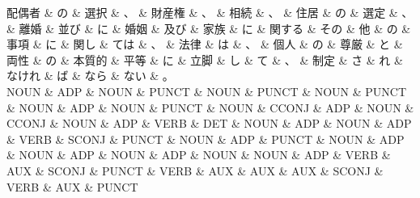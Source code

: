 \documentclass[tikz,border=5pt]{standalone}
\begin{document}
\small
\begin{dependency}[edge unit distance=11.9pt]
    \begin{deptext}[column sep=0.5em]
        配偶者 \& の \& 選択 \& 、 \& 財産権 \& 、 \& 相続 \& 、 \& 住居 \& の \& 選定 \& 、 \& 離婚 \& 並び \& に \& 婚姻 \& 及び \& 家族 \& に \& 関する \& その \& 他 \& の \& 事項 \& に \& 関し \& ては \& 、 \& 法律 \& は \& 、 \& 個人 \& の \& 尊厳 \& と \& 両性 \& の \& 本質的 \& 平等 \& に \& 立脚 \& し \& て \& 、 \& 制定 \& さ \& れ \& なけれ \& ば \& なら \& ない \& 。\\
        NOUN \& ADP \& NOUN \& PUNCT \& NOUN \& PUNCT \& NOUN \& PUNCT \& NOUN \& ADP \& NOUN \& PUNCT \& NOUN \& CCONJ \& ADP \& NOUN \& CCONJ \& NOUN \& ADP \& VERB \& DET \& NOUN \& ADP \& NOUN \& ADP \& VERB \& SCONJ \& PUNCT \& NOUN \& ADP \& PUNCT \& NOUN \& ADP \& NOUN \& ADP \& NOUN \& ADP \& NOUN \& NOUN \& ADP \& VERB \& AUX \& SCONJ \& PUNCT \& VERB \& AUX \& AUX \& AUX \& SCONJ \& VERB \& AUX \& PUNCT\\
    \end{deptext}
\end{dependency}
\end{document}
